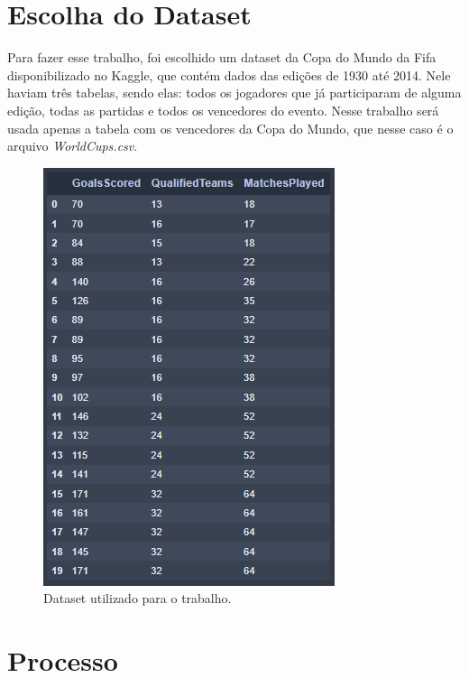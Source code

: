 \documentclass{article}
\begin{document}
\section*{Escolha do Dataset}
\begin{flushleft}
    Para fazer esse trabalho, foi escolhido um dataset da Copa do Mundo da Fifa disponibilizado no Kaggle, que contém dados das edições de 1930 até 2014. Nele haviam três tabelas, sendo elas: todos os jogadores que já participaram de alguma edição, todas as partidas e todos os vencedores do evento. Nesse trabalho será usada apenas a tabela com os vencedores da Copa do Mundo, que nesse caso é o arquivo \emph{WorldCups.csv}.
    \begin{figure}[h]
        \centering
        \includegraphics[scale=0.6]{tabelatratada}
        \caption{Dataset utilizado para o trabalho.}
        \label{fig:x cubed graph}
    \end{figure}
\end{flushleft}

\newpage
\section{Processo}
\end{document}
